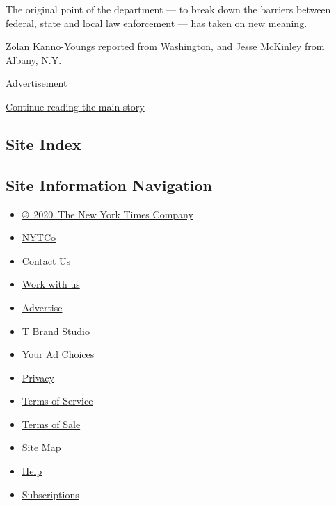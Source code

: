The original point of the department --- to break down the barriers
between federal, state and local law enforcement --- has taken on new
meaning.

Zolan Kanno-Youngs reported from Washington, and Jesse McKinley from
Albany, N.Y.

Advertisement

\protect\hyperlink{after-bottom}{Continue reading the main story}

\hypertarget{site-index}{%
\subsection{Site Index}\label{site-index}}

\hypertarget{site-information-navigation}{%
\subsection{Site Information
Navigation}\label{site-information-navigation}}

\begin{itemize}
\tightlist
\item
  \href{https://help.nytimes3xbfgragh.onion/hc/en-us/articles/115014792127-Copyright-notice}{©~2020~The
  New York Times Company}
\end{itemize}

\begin{itemize}
\tightlist
\item
  \href{https://www.nytco.com/}{NYTCo}
\item
  \href{https://help.nytimes3xbfgragh.onion/hc/en-us/articles/115015385887-Contact-Us}{Contact
  Us}
\item
  \href{https://www.nytco.com/careers/}{Work with us}
\item
  \href{https://nytmediakit.com/}{Advertise}
\item
  \href{http://www.tbrandstudio.com/}{T Brand Studio}
\item
  \href{https://www.nytimes3xbfgragh.onion/privacy/cookie-policy\#how-do-i-manage-trackers}{Your
  Ad Choices}
\item
  \href{https://www.nytimes3xbfgragh.onion/privacy}{Privacy}
\item
  \href{https://help.nytimes3xbfgragh.onion/hc/en-us/articles/115014893428-Terms-of-service}{Terms
  of Service}
\item
  \href{https://help.nytimes3xbfgragh.onion/hc/en-us/articles/115014893968-Terms-of-sale}{Terms
  of Sale}
\item
  \href{https://spiderbites.nytimes3xbfgragh.onion}{Site Map}
\item
  \href{https://help.nytimes3xbfgragh.onion/hc/en-us}{Help}
\item
  \href{https://www.nytimes3xbfgragh.onion/subscription?campaignId=37WXW}{Subscriptions}
\end{itemize}

